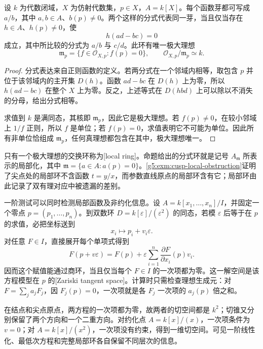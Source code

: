 \begin{proposition}\label{g5:prop:model-local-ring}
	设 \(k\) 为代数闭域，\(X\) 为仿射代数集，\(p\in X\)，\(A=k[X]\)。每个函数芽都可写成 \(a/b\)，其中 \(a,b\in A\)、\(b(p)\ne0\)。两个这样的分式代表同一芽，当且仅当存在 \(h\in A\)、\(h(p)\ne0\)，使
	\[
		h(ad-bc)=0
	\]
	成立，其中所比较的分式为 \(a/b\) 与 \(c/d\)。此环有唯一极大理想
	\[
		\mathfrak m_p=\{f\in\mathcal O_{X,p}:f(p)=0\},
		\qquad \mathcal O_{X,p}/\mathfrak m_p\simeq k.
	\]
\end{proposition}
\begin{proof}
	分式表达来自正则函数的定义。若两分式在一个邻域内相等，取包含 \(p\) 并位于该邻域内的主开集 \(D(h)\)。函数 \(ad-bc\) 在 \(D(h)\) 上为零，所以 \(h(ad-bc)\) 在整个 \(X\) 上为零。反之，上述等式在 \(D(hbd)\) 上可以除以不消失的分母，给出分式相等。

	求值到 \(k\) 是满同态，其核即 \(\mathfrak m_p\)，因此它是极大理想。若 \(f(p)\ne0\)，在较小邻域上 \(1/f\) 正则，所以 \(f\) 是单位；若 \(f(p)=0\)，求值表明它不可能为单位。因此所有非单位恰组成 \(\mathfrak m_p\)，任何真理想都包含在其中，极大理想唯一。
\end{proof}

只有一个极大理想的交换环称为[local ring]。命题给出的分式环就是记号 \(A_{\mathfrak m}\) 所表示的局部化，其中 \(\mathfrak m=\{a\in A:a(p)=0\}\)。\cref{g5:exm:cusp-local-obstruction}证明了尖点处的局部环不含函数 \(t=y/x\)，而参数直线原点的局部环含有它；局部环由此记录了双有理对应中被遗漏的差别。

\ProseParagraphBreak

一阶测试可以同时检测局部函数及非约化信息。设 \(A=k[x_1,\ldots,x_n]/I\)，并固定一个零点 \(p=(p_1,\ldots,p_n)\)。到双数环 \(D=k[\varepsilon]/(\varepsilon^2)\) 的同态，若模 \(\varepsilon\) 后等于在 \(p\) 的求值，必把坐标送到
\[
	x_i\longmapsto p_i+v_i\varepsilon .
\]
对任意 \(F\in I\)，直接展开每个单项式得到
\[
	F(p+v\varepsilon)=F(p)+
	\varepsilon\sum_{i=1}^n\frac{\partial F}{\partial x_i}(p)v_i.
\]
因而这个赋值能通过商环，当且仅当每个 \(F\in I\) 的一次项都为零。这一解空间是该方程模型在 \(p\) 的[Zariski tangent space]。计算时只需检查理想生成元：对 \(F=\sum_j a_jF_j\)，因 \(F_j(p)=0\)，一次项就是各 \(F_j\) 一次项的 \(a_j(p)\) 倍之和。

\ProseParagraphBreak

在结点和尖点原点，两方程的一次项都为零，故两者的切空间都是 \(k^2\)；切锥又分别保留了两个方向和一个二重方向。对约化点 \(A=k[x]/(x)\)，一次项条件为 \(v=0\)；对 \(A=k[x]/(x^2)\)，一次项没有约束，得到一维切空间。可见一阶线性化、最低次方程和完整局部环各自保留不同层次的信息。

